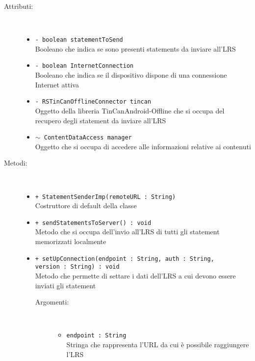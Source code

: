 \documentclass[../Tesi.tex]{subfiles}
\begin{document}
		\begin{description}
			\item[Attributi:] \
			\begin{itemize}
				\item \texttt{- boolean statementToSend}\\
				Booleano che indica se sono presenti statements da inviare all'LRS

				\item \texttt{- boolean InternetConnection}\\
				Booleano che indica se il dispositivo dispone di una connessione Internet attiva

				\item \texttt{- RSTinCanOfflineConnector tincan}\\
				Oggetto della libreria TinCanAndroid-Offline che si occupa del recupero degli statement da inviare all'LRS

				\item \texttt{$\sim$ ContentDataAccess manager}\\
				Oggetto che si occupa di accedere alle informazioni relative ai contenuti

			\end{itemize}

			\item[Metodi:] \
			\begin{itemize}
				\item \texttt{+ StatementSenderImp(remoteURL : String)}\\
				Costruttore di default della classe 
				
				\item \texttt{+ sendStatementsToServer() : void}\\
				Metodo che si occupa dell'invio all'LRS di tutti gli statement memorizzati localmente

				\item \texttt{+ setUpConnection(endpoint : String, auth : String, \\version : String) : void}\\
				Metodo che permette di settare i dati dell'LRS a cui devono essere inviati gli statement
				\begin{description}
					\item[Argomenti:] \
					\begin{itemize}
						\item \texttt{endpoint : String}\\
						Stringa che rappresenta l'URL da cui è possibile raggiungere l'LRS


\end{itemize}
\end{description}
\end{itemize}
\end{description}
\end{document}
